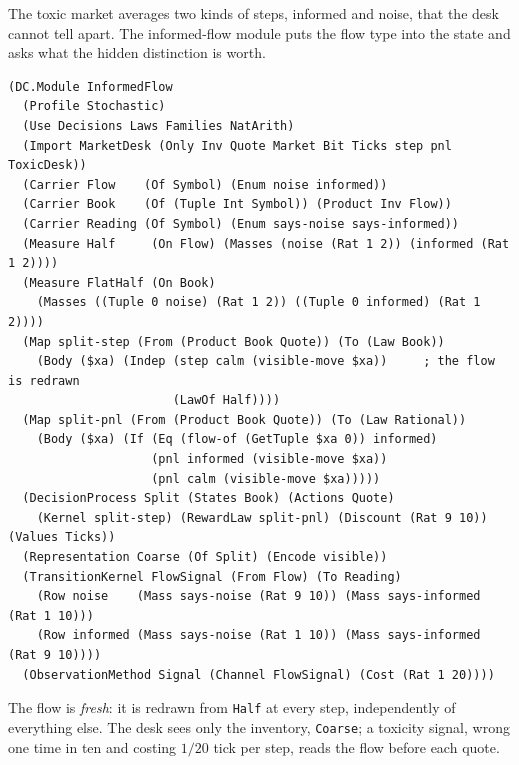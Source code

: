 \documentclass[11pt]{article}
\newcommand{\code}[1]{\texttt{#1}}
\theoremstyle{definition}
\theoremstyle{plain}
\begin{document}
The toxic market averages two kinds of steps, informed and noise, that the desk cannot tell apart. The
informed-flow module puts the flow type into the state and asks what the hidden distinction is worth.
\begin{lstlisting}
(DC.Module InformedFlow
  (Profile Stochastic)
  (Use Decisions Laws Families NatArith)
  (Import MarketDesk (Only Inv Quote Market Bit Ticks step pnl ToxicDesk))
  (Carrier Flow    (Of Symbol) (Enum noise informed))
  (Carrier Book    (Of (Tuple Int Symbol)) (Product Inv Flow))
  (Carrier Reading (Of Symbol) (Enum says-noise says-informed))
  (Measure Half     (On Flow) (Masses (noise (Rat 1 2)) (informed (Rat 1 2))))
  (Measure FlatHalf (On Book)
    (Masses ((Tuple 0 noise) (Rat 1 2)) ((Tuple 0 informed) (Rat 1 2))))
  (Map split-step (From (Product Book Quote)) (To (Law Book))
    (Body ($xa) (Indep (step calm (visible-move $xa))     ; the flow is redrawn
                       (LawOf Half))))
  (Map split-pnl (From (Product Book Quote)) (To (Law Rational))
    (Body ($xa) (If (Eq (flow-of (GetTuple $xa 0)) informed)
                    (pnl informed (visible-move $xa))
                    (pnl calm (visible-move $xa)))))
  (DecisionProcess Split (States Book) (Actions Quote)
    (Kernel split-step) (RewardLaw split-pnl) (Discount (Rat 9 10)) (Values Ticks))
  (Representation Coarse (Of Split) (Encode visible))
  (TransitionKernel FlowSignal (From Flow) (To Reading)
    (Row noise    (Mass says-noise (Rat 9 10)) (Mass says-informed (Rat 1 10)))
    (Row informed (Mass says-noise (Rat 1 10)) (Mass says-informed (Rat 9 10))))
  (ObservationMethod Signal (Channel FlowSignal) (Cost (Rat 1 20))))
\end{lstlisting}
The flow is \emph{fresh}: it is redrawn from \code{Half} at every step, independently of everything
else. The desk sees only the inventory, \code{Coarse}; a toxicity signal, wrong one time in ten and
costing $1/20$ tick per step, reads the flow before each quote.
\end{document}
